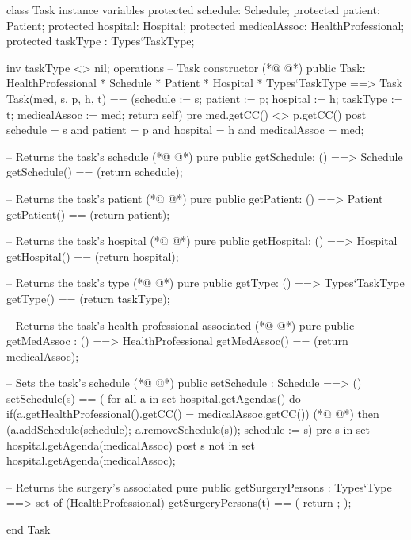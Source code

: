\begin{vdmpp}[breaklines=true]
class Task
instance variables
  protected schedule: Schedule;
  protected patient: Patient;
  protected hospital: Hospital;
  protected medicalAssoc: HealthProfessional;
  protected taskType : Types`TaskType;

  inv taskType <> nil;
operations
 -- Task constructor
(*@
\label{Task:12}
@*)
 public Task: HealthProfessional * Schedule * Patient * Hospital * Types`TaskType ==> Task
  Task(med, s, p, h, t) == (schedule := s; patient := p; hospital := h; taskType := t; medicalAssoc := med; return self)
 pre med.getCC() <> p.getCC()
 post schedule = s and patient = p and hospital = h and medicalAssoc = med;
 
 -- Returns the task's schedule
(*@
\label{getSchedule:18}
@*)
 pure public getSchedule: () ==> Schedule
  getSchedule() == (return schedule);
 
 -- Returns the task's patient
(*@
\label{getPatient:22}
@*)
 pure public getPatient: () ==> Patient
  getPatient() == (return patient);
 
 -- Returns the task's hospital
(*@
\label{getHospital:26}
@*)
 pure public getHospital: () ==> Hospital
  getHospital() == (return hospital);
 
 -- Returns the task's type
(*@
\label{getType:30}
@*)
 pure public getType: () ==> Types`TaskType
  getType() == (return taskType);
 
 -- Returns the task's health professional associated
(*@
\label{getMedAssoc:34}
@*)
 pure public getMedAssoc : () ==> HealthProfessional
  getMedAssoc() == (return medicalAssoc);
 
 -- Sets the task's schedule
(*@
\label{setSchedule:38}
@*)
 public setSchedule : Schedule ==> ()
  setSchedule(s) == (
   for all a in set hospital.getAgendas() do
    if(a.getHealthProfessional().getCC() = medicalAssoc.getCC())
(*@
\label{getSurgeryPersons:42}
@*)
     then (a.addSchedule(schedule); a.removeSchedule(s));
   schedule := s)
 pre s in set hospital.getAgenda(medicalAssoc)
 post s not in set hospital.getAgenda(medicalAssoc);
 
 -- Returns the surgery's associated
 pure public getSurgeryPersons : Types`Type ==> set of (HealthProfessional)
  getSurgeryPersons(t) == ( return {}; );

end Task
\end{vdmpp}
\bigskip
